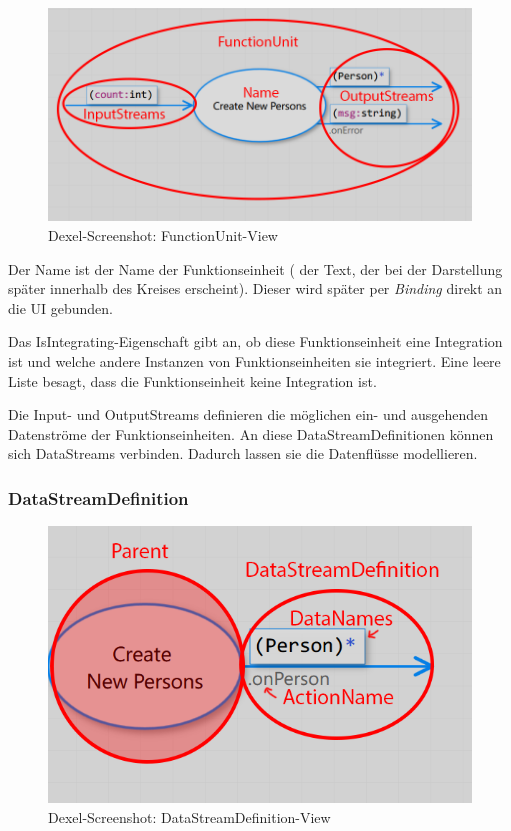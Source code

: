 \begin{figure}[H]
	\centering
	\includegraphics[width=0.9\linewidth]{./img/FunctionUnitView.png} 
	\caption{Dexel-Screenshot: FunctionUnit-View}
\end{figure}

Der Name ist der Name der Funktionseinheit ( der Text, der bei der
Darstellung später innerhalb des Kreises erscheint). Dieser wird später per \textit{Binding}
direkt an die UI gebunden. 

Das IsIntegrating-Eigenschaft gibt an, ob diese Funktionseinheit eine Integration
ist und welche andere Instanzen von Funktionseinheiten sie integriert.
Eine leere Liste besagt, dass die Funktionseinheit keine Integration ist.

Die Input- und OutputStreams definieren die möglichen ein- und ausgehenden
Datenströme der Funktionseinheiten. An diese DataStreamDefinitionen können sich DataStreams
verbinden. Dadurch lassen sie die Datenflüsse modellieren.


	\subsubsection{DataStreamDefinition}

	
		
		\begin{figure}[H]
			\centering
			\includegraphics[width=0.6\linewidth]{./img/DataStreamDefinitionView.png} 
			\caption{Dexel-Screenshot: DataStreamDefinition-View}
		\end{figure}
	
